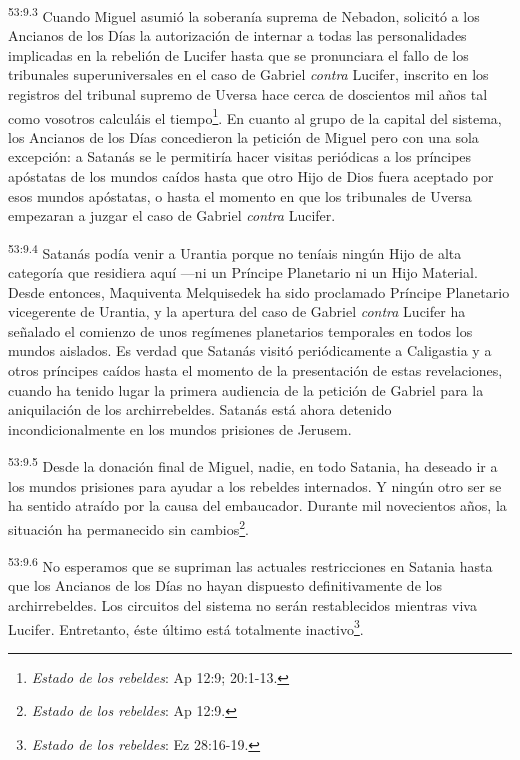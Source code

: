\par
\textsuperscript{53:9.3} Cuando Miguel asumió la soberanía suprema de Nebadon, solicitó a los Ancianos de los Días la autorización de internar a todas las personalidades implicadas en la rebelión de Lucifer hasta que se pronunciara el fallo de los tribunales superuniversales en el caso de Gabriel \textit{contra} Lucifer, inscrito en los registros del tribunal supremo de Uversa hace cerca de doscientos mil años tal como vosotros calculáis el tiempo\footnote{\textit{Estado de los rebeldes}: Ap 12:9; 20:1-13.}. En cuanto al grupo de la capital del sistema, los Ancianos de los Días concedieron la petición de Miguel pero con una sola excepción: a Satanás se le permitiría hacer visitas periódicas a los príncipes apóstatas de los mundos caídos hasta que otro Hijo de Dios fuera aceptado por esos mundos apóstatas, o hasta el momento en que los tribunales de Uversa empezaran a juzgar el caso de Gabriel \textit{contra} Lucifer.

\par
\textsuperscript{53:9.4} Satanás podía venir a Urantia porque no teníais ningún Hijo de alta categoría que residiera aquí ---ni un Príncipe Planetario ni un Hijo Material. Desde entonces, Maquiventa Melquisedek ha sido proclamado Príncipe Planetario vicegerente de Urantia, y la apertura del caso de Gabriel \textit{contra} Lucifer ha señalado el comienzo de unos regímenes planetarios temporales en todos los mundos aislados. Es verdad que Satanás visitó periódicamente a Caligastia y a otros príncipes caídos hasta el momento de la presentación de estas revelaciones, cuando ha tenido lugar la primera audiencia de la petición de Gabriel para la aniquilación de los archirrebeldes. Satanás está ahora detenido incondicionalmente en los mundos prisiones de Jerusem.

\par
\textsuperscript{53:9.5} Desde la donación final de Miguel, nadie, en todo Satania, ha deseado ir a los mundos prisiones para ayudar a los rebeldes internados. Y ningún otro ser se ha sentido atraído por la causa del embaucador. Durante mil novecientos años, la situación ha permanecido sin cambios\footnote{\textit{Estado de los rebeldes}: Ap 12:9.}.

\par
\textsuperscript{53:9.6} No esperamos que se supriman las actuales restricciones en Satania hasta que los Ancianos de los Días no hayan dispuesto definitivamente de los archirrebeldes. Los circuitos del sistema no serán restablecidos mientras viva Lucifer. Entretanto, éste último está totalmente inactivo\footnote{\textit{Estado de los rebeldes}: Ez 28:16-19.}.

